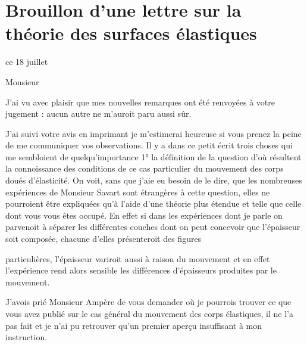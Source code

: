 \documentclass[11pt,a4paper]{article}
\begin{document}
\section{Brouillon d'une lettre sur la théorie des surfaces élastiques}


ce 18 juillet

Monsieur

J'ai vu avec plaisir que mes nouvelles remarques ont été renvoyées à votre
jugement : aucun autre ne m'auroit paru aussi sûr.

J'ai suivi votre avis en imprimant je m'estimerai heureuse si vous prenez la
peine de me communiquer vos observations. Il y a dans ce petit écrit trois
choses qui me sembloient de quelqu'importance 1° la définition de la question
d'où résultent la connoissance des conditions de ce cas particulier du
mouvement des corps doués d'élasticité. On voit, sans que j'aie eu besoin de
le dire, que les nombreuses expériences de Monsieur Savart sont étrangères à
cette question, elles ne pourroient être expliquées qu'à l'aide d'une théorie
plus étendue et telle que celle dont vous vous êtes occupé.
En effet si dans les expériences dont je parle on parvenoit à séparer les
différentes couches dont on peut concevoir que l'épaisseur soit composée,
chacune d'elles présenteroit des figures


particulières, l'épaisseur variroit aussi à raison du mouvement et en effet
l'expérience rend alors sensible les différences d'épaisseurs produites par le
mouvement.

J'avois prié Monsieur Ampère de vous demander où je pourrois trouver ce que
vous avez publié sur le cas général du mouvement des corps élastiques, il ne
l'a pas fait et je n'ai pu retrouver qu'un premier aperçu insuffisant à mon
instruction.
\end{document}

